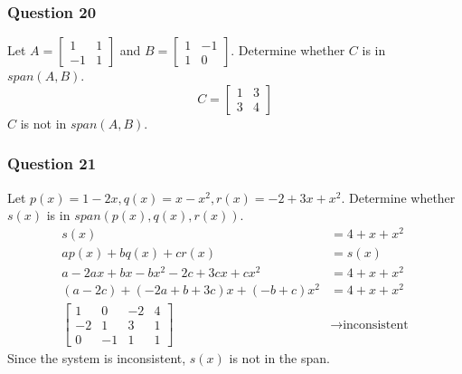 \documentclass{math}
\begin{document}
\subsubsection*{Question 20}
Let \( A = \begin{bmatrix}1 & 1 \\ -1 & 1\end{bmatrix} \) and \( B =
\begin{bmatrix}1 & -1 \\ 1 & 0\end{bmatrix} \). Determine whether \( C \) is
in \( span(A,B) \).
\[ C = \begin{bmatrix}1 & 3 \\ 3 & 4\end{bmatrix} \]
\( C \) is not in \( span(A,B) \).

\subsubsection*{Question 21}
Let \( p(x) = 1-2x, q(x) = x-x^2, r(x) = -2+3x+x^2 \). Determine whether
\( s(x) \) is in \( span(p(x),q(x),r(x)) \).
\begin{align*}
  s(x) &= 4+x+x^2 \\
  ap(x)+bq(x)+cr(x) &= s(x) \\
  a-2ax+bx-bx^2-2c+3cx+cx^2 &= 4+x+x^2 \\
  (a-2c)+(-2a+b+3c)x+(-b+c)x^2 &= 4+x+x^2 \\
  \left[\begin{array}{ccc|c}
    1 & 0 & -2 & 4 \\
    -2 & 1 & 3 & 1 \\
    0 & -1 & 1 & 1
  \end{array}\right] &\to \text{inconsistent}
\end{align*}
Since the system is inconsistent, \( s(x) \) is not in the span.
\end{document}
